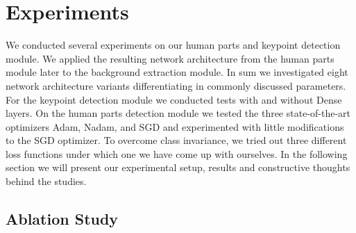 

\chapter{Experiments} %

\label{experiments} %
We conducted several experiments on our human parts and keypoint detection module.
We applied the resulting network architecture from the human parts module later to the background extraction module.
In sum we investigated eight network architecture variants differentiating in commonly discussed parameters.
For the keypoint detection module we conducted tests with and without Dense layers.
On the human parts detection module we tested the three state-of-the-art optimizers Adam, Nadam, and SGD and experimented with little
modifications to the SGD optimizer.
To overcome class invariance, we tried out three different loss functions under which one we have come up with
ourselves.
In the following section we will present our experimental setup, results and constructive thoughts behind the studies.



\section{Ablation Study}




